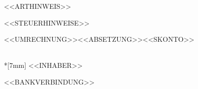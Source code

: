 \documentclass[11pt,a4paper]{article}
\begin{document}
<<ARTHINWEIS>>

\vspace{6mm}

<<STEUERHINWEISE>>

<<UMRECHNUNG>><<ABSETZUNG>><<SKONTO>>

\vspace{5mm}

\nopagebreak
\vspace{5mm}

\wortgruss\\*[7mm]
<<INHABER>>

<<BANKVERBINDUNG>>
\end{document}
